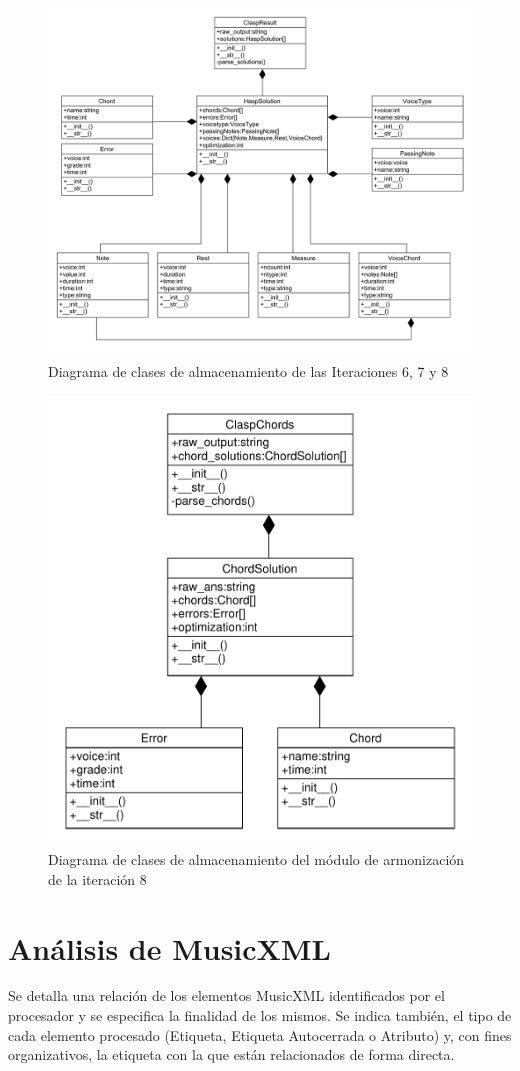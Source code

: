\begin{figure}[th]
	\centering
	\includegraphics[width=0.8\linewidth]{imagenes/sixth_seventh_eighth_iters.pdf}
	\caption{Diagrama de clases de almacenamiento de las Iteraciones 6, 7 y 8}
	\label{fig:class_diagram_sixth_seventh_eighth}
\end{figure}
\begin{figure}[th]
	\centering
	\includegraphics[width=0.8\linewidth]{imagenes/chord_diagram.pdf}
	\caption{Diagrama de clases de almacenamiento del módulo de armonización de la iteración 8}
	\label{fig:class_diagram_chords}
\end{figure}

\chapter{Análisis de MusicXML}
\label{chap:musicxml_analysis}
Se detalla una relación de los elementos MusicXML identificados por el procesador y se especifica la finalidad de los mismos. Se indica también, el tipo de cada elemento procesado (Etiqueta, Etiqueta Autocerrada o Atributo) y, con fines organizativos, la etiqueta con la que están relacionados de forma directa.


